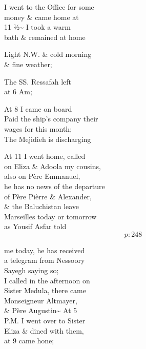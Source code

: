 \documentclass{report}
\begin{document}
	\par{
 	I went to the Office for some\ \\money \& came home at\ \\11 ½\~{} I took a warm\ \\bath \& remained at home\ \\
	}

	\par{
 	Light N.W. \& cold morning\ \\\& fine weather;\ \\
	}

	\par{
 	The SS. Ressafah left\ \\at 6 Am;\ \\
	}

	\par{
 	At 8 I came on board\ \\Paid the ship’s company their\ \\wages for this month;\ \\The Mejidieh is discharging\ \\
	}

	\par{
 	At 11 I went home, called\ \\on Eliza \& Adoola my cousins,\ \\also on Père Emmanuel,\ \\he has no news of the departure\ \\of Père Pièrre \& Alexander,\ \\\& the Baluchistan leave\ \\Marseilles today or tomorrow\ \\as Yousif Asfar told\ \\
  \[p: 248 \]

	}

	\par{
 	me today, he has received\ \\a telegram from Nessoory\ \\Sayegh saying so;\ \\I called in the afternoon on\ \\Sister Medula, there came\ \\Monseigneur Altmayer,\ \\\& Père Augustin\~{} At 5\ \\P.M. I went over to Sister\ \\Eliza \& dined with them,\ \\at 9 came hone;\ \\
	}
\end{document}
